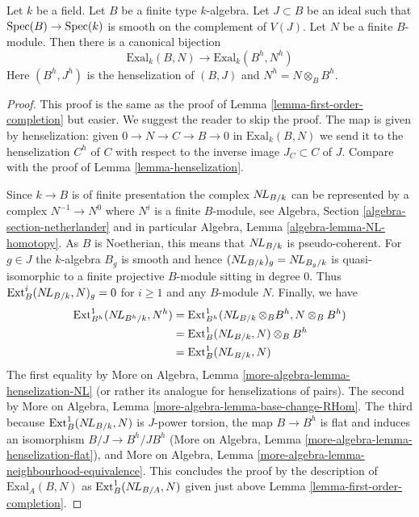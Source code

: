 \begin{lemma}
\label{lemma-first-order-henselization}
Let $k$ be a field. Let $B$ be a finite type $k$-algebra.
Let $J \subset B$ be an ideal such that
$\mathop{\mathrm{Spec}}(B) \to \mathop{\mathrm{Spec}}(k)$ is smooth on the complement of $V(J)$.
Let $N$ be a finite $B$-module.
Then there is a canonical bijection
$$
\text{Exal}_k(B, N) \to \text{Exal}_k(B^h, N^h)
$$
Here $(B^h, J^h)$ is the henselization of $(B, J)$
and $N^h = N \otimes_B B^h$.
\end{lemma}

\begin{proof}
This proof is the same as the proof of
Lemma \ref{lemma-first-order-completion} but easier. We suggest the
reader to skip the proof.
The map is given by henselization: given $0 \to N \to C \to B \to 0$
in $\text{Exal}_k(B, N)$ we send it to the
henselization $C^h$
of $C$ with respect to the inverse image $J_C \subset C$ of $J$.
Compare with the proof of Lemma \ref{lemma-henselization}.

\medskip\noindent
Since $k \to B$ is of finite presentation the complex
$\mathop{N\!L}\nolimits_{B/k}$ can be represented by a complex
$N^{-1} \to N^0$ where $N^i$ is a finite $B$-module, see
Algebra, Section \ref{algebra-section-netherlander} and
in particular
Algebra, Lemma \ref{algebra-lemma-NL-homotopy}.
As $B$ is Noetherian, this means that $\mathop{N\!L}\nolimits_{B/k}$
is pseudo-coherent. For $g \in J$ the $k$-algebra $B_g$
is smooth and hence $(\mathop{N\!L}\nolimits_{B/k})_g = \mathop{N\!L}\nolimits_{B_g/k}$
is quasi-isomorphic to a finite projective $B$-module sitting in degree $0$.
Thus $\text{Ext}^i_B(\mathop{N\!L}\nolimits_{B/k}, N)_g = 0$ for $i \geq 1$
and any $B$-module $N$. Finally, we have
\begin{align*}
\text{Ext}^1_{B^h}(\mathop{N\!L}\nolimits_{B^h/k}, N^h)
& =
\text{Ext}^1_{B^h}(\mathop{N\!L}\nolimits_{B/k} \otimes_B B^h, N \otimes_B B^h) \\
& =
\text{Ext}^1_B(\mathop{N\!L}\nolimits_{B/k}, N) \otimes_B B^h \\
& =
\text{Ext}^1_B(\mathop{N\!L}\nolimits_{B/k}, N)
\end{align*}
The first equality by
More on Algebra, Lemma \ref{more-algebra-lemma-henselization-NL}
(or rather its analogue for henselizations of pairs).
The second by
More on Algebra, Lemma \ref{more-algebra-lemma-base-change-RHom}.
The third because $\text{Ext}^1_B(\mathop{N\!L}\nolimits_{B/k}, N)$ is $J$-power
torsion, the map $B \to B^h$ is flat and induces an isomorphism
$B/J \to B^h/JB^h$ (More on Algebra, Lemma
\ref{more-algebra-lemma-henselization-flat}), and
More on Algebra, Lemma \ref{more-algebra-lemma-neighbourhood-equivalence}.
This concludes the proof by the description of $\text{Exal}_A(B, N)$
as $\text{Ext}^1_B(\mathop{N\!L}\nolimits_{B/A}, N)$ given just above
Lemma \ref{lemma-first-order-completion}.
\end{proof}


